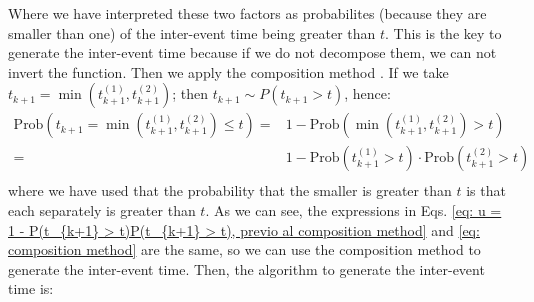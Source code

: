 Where we have interpreted these two factors as probabilites (because they are smaller than one) of the inter-event time being greater than $t$. This is the key to generate the inter-event time
because if we do not decompose them, we can not invert the function.
Then we apply the composition method \cite{dassios2013exact}. If we take $t_{k+1}=\min\left( t_{k+1}^{(1)},t_{k+1}^{(2)} \right)$; then $t_{k+1}\sim P(t_{k+1}>t)$, hence:
\begin{equation}
    \begin{split}
        \text{Prob}(t_{k+1}=\min\left(  t_{k+1}^{(1)},t_{k+1}^{(2)} \right)\leq t)=&1-\text{Prob}\left( \min \left( t_{k+1}^{(1)},t_{k+1}^{(2)}\right)>t \right)\\
        =&1-\text{Prob}\left( t_{k+1}^{(1)}>t \right)\cdot\text{Prob}\left( t_{k+1}^{(2)}>t \right)\\
    \end{split}
    \label{eq: composition method}
\end{equation}
where we have used that the probability that the smaller is greater than $t$ is that each separately is greater than $t$. As we can 
see, the expressions in Eqs. \ref{eq: u = 1 - P(t_{k+1} > t)P(t_{k+1} > t), previo al composition method} and \ref{eq: composition method} are the same, so we can use the composition 
method to generate the inter-event time. Then, the algorithm to generate the inter-event time is:
